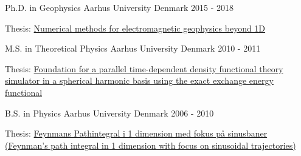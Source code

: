

\begin{cventries}

  \cventry
    {Ph.D. in Geophysics} %
    {Aarhus University} %
    {Denmark} %
    {2015 - 2018} %
    {
      \begin{cvitems} %
        \item {Thesis: \href{https://www.forskningsdatabasen.dk/en/catalog/2392633187}{Numerical methods for electromagnetic geophysics beyond 1D}}
      \end{cvitems}
    }

  \cventry
    {M.S. in Theoretical Physics} %
    {Aarhus University} %
    {Denmark} %
    {2010 - 2011} %
    {
      \begin{cvitems} %
        \item {Thesis: \href{https://phys.au.dk/fileadmin/site_files/forskning/ltc/theses/thesistue.pdf}{Foundation for a parallel time-dependent density functional theory simulator in a spherical harmonic basis using the exact exchange energy functional}}
      \end{cvitems}
    }

  \cventry
    {B.S. in Physics} %
    {Aarhus University} %
    {Denmark} %
    {2006 - 2010} %
    {
      \begin{cvitems} %
        \item {Thesis: \href{https://users-phys.au.dk/~fedorov/subatom/bachelor/tue-feynman-path.pdf}{Feynmans Pathintegral i 1 dimension med fokus på sinusbaner (Feynman's path integral in 1 dimension with focus on sinusoidal trajectories)}}
      \end{cvitems}
    }

\end{cventries}

